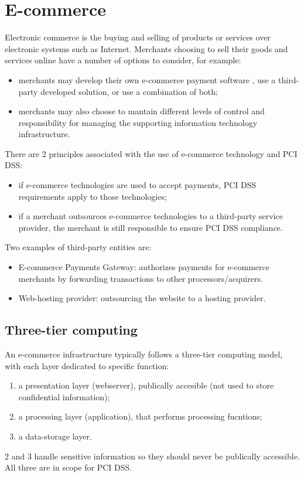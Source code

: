 \documentclass[a4paper, 10pt, titlepage]{article}
\begin{document}
\section{E-commerce}
Electronic commerce is the buying and selling of products or services over electronic systems such as Internet. Merchants choosing to sell their goods and services online have a number of options to consider, for example:
\begin{itemize}
\item merchants may develop their own e-commerce payment software , use a third-party developed solution, or use a combination of both;
\item merchants may also choose to mantain different levels of control and responsibility for managing the supporting information technology infrastructure.
\end{itemize}
There are 2 principles associated with the use of e-commerce technology and PCI DSS:
\begin{itemize}
\item if e-commerce technologies are used to accept payments, PCI DSS requirements apply to those technologies;
\item if a merchant outsources e-commerce technologies to a third-party service provider, the merchant is still responsible to ensure PCI DSS compliance.
\end{itemize}
Two examples of third-party entities are:
\begin{itemize}
\item E-commerce Payments Gateway: authorizes payments for e-commerce merchants by forwarding transactions to other processors/acquirers.
\item Web-hosting provider: outsourcing the website to a hosting provider.
\end{itemize}

\subsection{Three-tier computing}
An e-commerce infrastructure typically follows a three-tier computing model, with each layer dedicated to specific function:
\begin{enumerate}
\item a presentation layer (webserver), publically accesible (not used to store confidential information);
\item a processing layer (application), that performs processing fucntions;
\item a data-storage layer.
\end{enumerate}
2 and 3 handle sensitive information so they should never be publically accessible. All three are in scope for PCI DSS.
\end{document}

